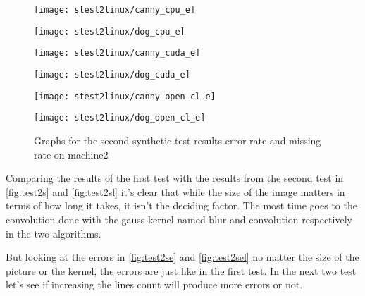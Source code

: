 \begin{figure}[H]
\centering
\begin{minipage}[t]{.49\textwidth}
\centering
\texttt{[image: stest2linux/canny\_cpu\_e]}
\end{minipage}
\begin{minipage}[t]{.49\textwidth}
\centering
\texttt{[image: stest2linux/dog\_cpu\_e]}
\end{minipage}
\begin{minipage}[t]{.49\textwidth}
\centering
\texttt{[image: stest2linux/canny\_cuda\_e]}
\end{minipage}
\begin{minipage}[t]{.49\textwidth}
\centering
\texttt{[image: stest2linux/dog\_cuda\_e]}
\end{minipage}
\begin{minipage}[t]{.49\textwidth}
\centering
\texttt{[image: stest2linux/canny\_open\_cl\_e]}
\end{minipage}
\begin{minipage}[t]{.49\textwidth}
\centering
\texttt{[image: stest2linux/dog\_open\_cl\_e]}
\end{minipage}
\caption{Graphs for the second synthetic test results error rate and missing rate on machine2}
\label{fig:test2sel}
\end{figure}

Comparing the results of the first test with the results from the second test in \autoref{fig:test2s} and \autoref{fig:test2sl} it's clear that while the size of the image matters in terms of how long it takes, it isn't the deciding factor. The most time goes to the convolution done with the gauss kernel named blur and convolution respectively in the two algorithms.

But looking at the errors in \autoref{fig:test2se} and \autoref{fig:test2sel} no matter the size of the picture or the kernel, the errors are just like in the first test. In the next two test let's see if increasing the lines count will produce more errors or not.


